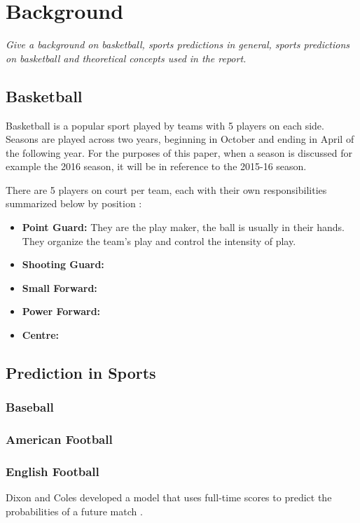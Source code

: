 \chapter{Background}

\textit{Give a background on basketball, sports predictions in general, sports predictions on basketball and theoretical concepts used in the report.}

\section{Basketball}
Basketball is a popular sport played by teams with 5 players on each side.  Seasons are played across two years, beginning in October and ending in April of the following year.  For the purposes of this paper, when a season is discussed for example the 2016 season, it will be in reference to the 2015-16 season.

There are 5 players on court per team, each with their own responsibilities summarized below by position \cite{player_criteria}:

\begin{itemize}
	\item \textbf{Point Guard:} They are the play maker, the ball is usually in their hands.  They organize the team's play and control the intensity of play.
	\item \textbf{Shooting Guard:}
	\item \textbf{Small Forward:}
	\item \textbf{Power Forward:}
	\item \textbf{Centre:}
\end{itemize}

\section{Prediction in Sports}

\subsection{Baseball}

\subsection{American Football}

\subsection{English Football}
Dixon and Coles developed a model that uses full-time scores to predict the probabilities of a future match \citep{dixon_coles}.

